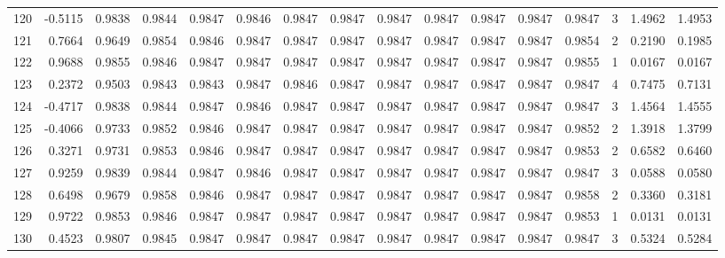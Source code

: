 \begin{tabular}{lrrrrrrrrrrrrrrr}
120 &     -0.5115 &  0.9838 &  0.9844 &  0.9847 &  0.9846 &  0.9847 &  0.9847 &  0.9847 &  0.9847 &  0.9847 &   0.9847 &     0.9847 &      3 &                    1.4962 &                     1.4953 \\
121 &      0.7664 &  0.9649 &  0.9854 &  0.9846 &  0.9847 &  0.9847 &  0.9847 &  0.9847 &  0.9847 &  0.9847 &   0.9847 &     0.9854 &      2 &                    0.2190 &                     0.1985 \\
122 &      0.9688 &  0.9855 &  0.9846 &  0.9847 &  0.9847 &  0.9847 &  0.9847 &  0.9847 &  0.9847 &  0.9847 &   0.9847 &     0.9855 &      1 &                    0.0167 &                     0.0167 \\
123 &      0.2372 &  0.9503 &  0.9843 &  0.9843 &  0.9847 &  0.9846 &  0.9847 &  0.9847 &  0.9847 &  0.9847 &   0.9847 &     0.9847 &      4 &                    0.7475 &                     0.7131 \\
124 &     -0.4717 &  0.9838 &  0.9844 &  0.9847 &  0.9846 &  0.9847 &  0.9847 &  0.9847 &  0.9847 &  0.9847 &   0.9847 &     0.9847 &      3 &                    1.4564 &                     1.4555 \\
125 &     -0.4066 &  0.9733 &  0.9852 &  0.9846 &  0.9847 &  0.9847 &  0.9847 &  0.9847 &  0.9847 &  0.9847 &   0.9847 &     0.9852 &      2 &                    1.3918 &                     1.3799 \\
126 &      0.3271 &  0.9731 &  0.9853 &  0.9846 &  0.9847 &  0.9847 &  0.9847 &  0.9847 &  0.9847 &  0.9847 &   0.9847 &     0.9853 &      2 &                    0.6582 &                     0.6460 \\
127 &      0.9259 &  0.9839 &  0.9844 &  0.9847 &  0.9846 &  0.9847 &  0.9847 &  0.9847 &  0.9847 &  0.9847 &   0.9847 &     0.9847 &      3 &                    0.0588 &                     0.0580 \\
128 &      0.6498 &  0.9679 &  0.9858 &  0.9846 &  0.9847 &  0.9847 &  0.9847 &  0.9847 &  0.9847 &  0.9847 &   0.9847 &     0.9858 &      2 &                    0.3360 &                     0.3181 \\
129 &      0.9722 &  0.9853 &  0.9846 &  0.9847 &  0.9847 &  0.9847 &  0.9847 &  0.9847 &  0.9847 &  0.9847 &   0.9847 &     0.9853 &      1 &                    0.0131 &                     0.0131 \\
130 &      0.4523 &  0.9807 &  0.9845 &  0.9847 &  0.9847 &  0.9847 &  0.9847 &  0.9847 &  0.9847 &  0.9847 &   0.9847 &     0.9847 &      3 &                    0.5324 &                     0.5284 \\

\end{tabular}
